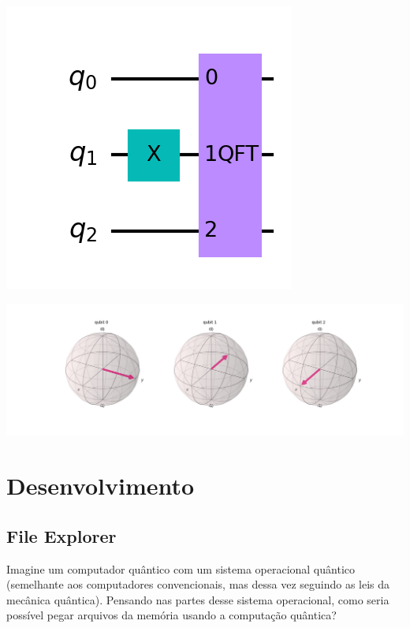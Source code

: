 \documentclass{article}
\begin{document}
\begin{center}
	\includegraphics[scale=0.4]{QFT_1.png}
	\label{fig:QFT}
\end{center}

\begin{center}
	\includegraphics[scale=0.3]{QFT_1_bloch.png}
	\label{fig:QFT-bloch}
\end{center}


\section{Desenvolvimento}
\subsection{File Explorer}

Imagine um computador quântico com um sistema operacional quântico (semelhante aos computadores convencionais, mas dessa vez seguindo as leis da mecânica quântica). Pensando nas partes desse sistema operacional, como seria possível pegar arquivos da memória usando a computação quântica?
\end{document}
